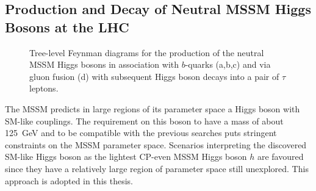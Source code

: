 \subsection{Production and Decay of Neutral MSSM Higgs Bosons at the LHC}
\begin{figure}[tp]
     \begin{center}
     \hspace{0.2cm}	
     	\hspace{0.2cm}	
     \end{center}
    \caption{Tree-level Feynman diagrams for the production of the neutral MSSM Higgs bosons in association with  $b$-quarks (a,b,c) and via gluon fusion (d) 
	 with subsequent Higgs boson decays into a pair of $\tau$ leptons.}
   \label{fig:prod}
\end{figure}
The MSSM predicts in large regions of its parameter space a Higgs boson with SM-like couplings. 
The  requirement on this boson to have a mass of about 125~GeV and to be  compatible with the previous 
searches puts  stringent constraints on the MSSM parameter space.
Scenarios interpreting the discovered SM-like Higgs boson as the lightest CP-even MSSM Higgs boson $h$ 
are favoured since they have a relatively large region of parameter space still unexplored. 
This approach is adopted in  this thesis.

